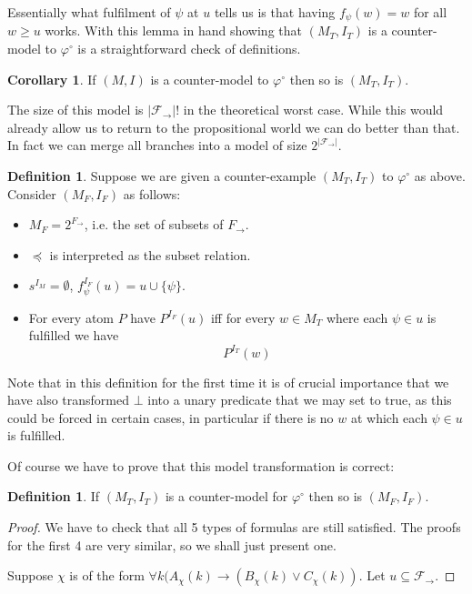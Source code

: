 \documentclass[a4paper,12pt]{report}
\theoremstyle{definition}
\theoremstyle{definition}
\newtheorem{corollary}[theorem]{Corollary}
\theoremstyle{definition}
\theoremstyle{definition}
\theoremstyle{definition}
\newtheorem{definition}[theorem]{Definition}
\theoremstyle{definition}
\theoremstyle{definition}
\begin{document}
	Essentially what fulfilment of $\psi$ at $u$ tells us is that having $f_\psi(w) = w$ for all $w\geq u$ works. 
	With this lemma in hand showing that $(M_T, I_T)$ is a counter-model to $\varphi^\circ$ is a straightforward check of definitions.
	
	\begin{corollary}
		If $(M, I)$ is a counter-model to $\varphi^\circ$ then so is $(M_T, I_T)$.
	\end{corollary}
	
	The size of this model is $|\mathcal F_\to|!$ in the theoretical worst case. While this would already allow us to return to the propositional world we can do better than that. In fact we can merge all branches into a model of size $2^{|\mathcal F_\to|}$.
	
	\begin{definition}
		Suppose we are given a counter-example $(M_T, I_T)$ to $\varphi^\circ$ as above. Consider $(M_F, I_F)$ as follows:
		\begin{itemize}
			\item $M_F = 2^{F_\to}$, i.e. the set of subsets of $F_\to$.
			\item $\preceq$ is interpreted as the subset relation.
			\item $s^{I_M} = \emptyset$, $f_\psi^{I_F}(u) = u\cup\{\psi\}$.
			\item For every atom $P$ have $P^{I_F}(u)$ iff for every $w\in M_T$ where each $\psi\in u$ is fulfilled we have $$P^{I_T}(w)$$
		\end{itemize}
	\end{definition}
	
	Note that in this definition for the first time it is of crucial importance that we have also transformed $\bot$ into a unary predicate that we may set to true, as this could be forced in certain cases, in particular if there is no $w$ at which each $\psi\in u$ is fulfilled.
	
	Of course we have to prove that this model transformation is correct:
	
	\begin{definition}
		If $(M_T, I_T)$ is a counter-model for $\varphi^\circ$ then so is $(M_F, I_F)$.
	\end{definition}
	\begin{proof}
		We have to check that all 5 types of formulas are still satisfied. The proofs for the first 4 are very similar, so we shall just present one.
		
		Suppose $\chi$ is of  the form $\forall k(A_\chi(k)\to (B_\chi(k)\vee C_\chi(k))$. Let $u\subseteq \mathcal F_\to$.
	\end{proof}
\end{document}
